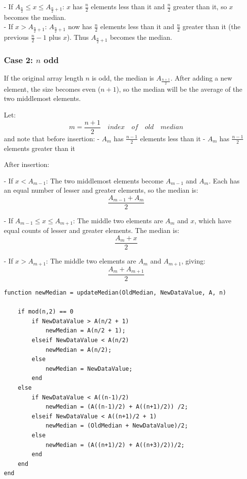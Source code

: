 \documentclass{report}
\begin{document}
- If $A_{\frac{n}{2}} \leq x \leq A_{\frac{n}{2} + 1}$:  
  $x$ has $\frac{n}{2}$ elements less than it and $\frac{n}{2}$ greater than it, so $x$ becomes the median.\\
  

- If $x > A_{\frac{n}{2} + 1}$:  
  $A_{\frac{n}{2} + 1}$ now has $\frac{n}{2}$ elements less than it and $\frac{n}{2}$ greater than it (the previous $\frac{n}{2} - 1$ plus $x$). Thus $A_{\frac{n}{2} + 1}$ becomes the median.
  

\subsubsection*{Case 2: $n$ odd}  
If the original array length $n$ is odd, the median is $A_{\frac{n+1}{2}}$. After adding a new element, the size becomes even ($n+1$), so the median will be the average of the two middlemost elements.

Let:
\[
m = \frac{n+1}{2} \quad index \quad of \quad old \quad median
\]
and note that before insertion:
- $A_m$ has $\frac{n-1}{2}$ elements less than it
- $A_m$ has $\frac{n-1}{2}$ elements greater than it

After insertion:

- If $x < A_{m-1}$:  
  The two middlemost elements become $A_{m-1}$ and $A_m$. Each has an equal number of lesser and greater elements, so the median is:
  \[
  \frac{A_{m-1} + A_m}{2}
  \]

- If $A_{m-1} \leq x \leq A_{m+1}$:  
  The middle two elements are $A_m$ and $x$, which have equal counts of lesser and greater elements. The median is:
  \[
  \frac{A_m + x}{2}
  \]

- If $x > A_{m+1}$:  
  The middle two elements are $A_m$ and $A_{m+1}$, giving:
  \[
  \frac{A_m + A_{m+1}}{2}
  \]

\begin{verbatim}
function newMedian = updateMedian(OldMedian, NewDataValue, A, n)

    if mod(n,2) == 0
        if NewDataValue > A(n/2 + 1)
            newMedian = A(n/2 + 1);
        elseif NewDataValue < A(n/2)
            newMedian = A(n/2);
        else
            newMedian = NewDataValue;
        end
    else
        if NewDataValue < A((n-1)/2)
            newMedian = (A((n-1)/2) + A((n+1)/2)) /2;
        elseif NewDataValue < A((n+1)/2 + 1)
            newMedian = (OldMedian + NewDataValue)/2;
        else
            newMedian = (A((n+1)/2) + A((n+3)/2))/2;
        end
    end
end
\end{verbatim}
\end{document}

